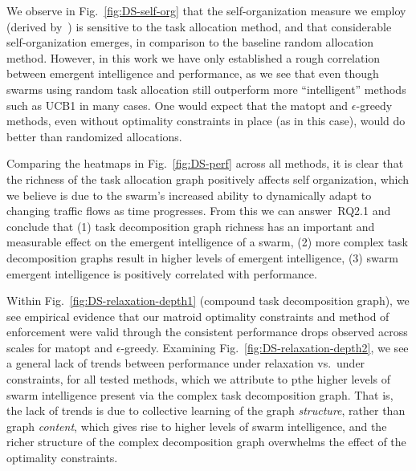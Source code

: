 We observe in Fig.~\ref{fig:DS-self-org} that the self-organization measure we employ
(derived by~\cite{Harwell2019a}) is sensitive to the task allocation method, and that
considerable self-organization emerges, in comparison to the baseline random
allocation method. However, in this work we have only established a rough correlation
between emergent intelligence and performance, as we see that even though swarms
using random task allocation still outperform more ``intelligent'' methods such as
UCB1 in many cases. One would expect that the \gls{matopt} and $\epsilon$-greedy methods,
even without optimality constraints in place (as in this case), would do better than
randomized allocations.

Comparing the heatmaps in Fig.~\ref{fig:DS-perf} across all methods, it is clear that
the richness of the task allocation graph positively affects self organization, which
we believe is due to the swarm's increased ability to dynamically adapt to changing
traffic flows as time progresses. From this we can answer~\gls{RQ2.1} and
conclude that (1) task decomposition graph richness has an important and measurable
effect on the emergent intelligence of a swarm, (2) more complex task decomposition
graphs result in higher levels of emergent intelligence, (3) swarm emergent
intelligence is positively correlated with performance.

Within Fig.~\ref{fig:DS-relaxation-depth1} (compound task decomposition graph), we
see empirical evidence that our matroid optimality constraints and method of
enforcement were valid through the consistent performance drops observed across
scales for \gls{matopt} and $\epsilon$-greedy. Examining
Fig.~\ref{fig:DS-relaxation-depth2}, we see a general lack of trends between
performance under relaxation vs.~under constraints, for all tested methods, which we
attribute to pthe higher levels of swarm intelligence present via the complex task
decomposition graph. That is, the lack of trends is due to collective learning of the
graph \emph{structure}, rather than graph \emph{content}, which gives rise to higher
levels of swarm intelligence, and the richer structure of the complex decomposition
graph overwhelms the effect of the optimality constraints.

